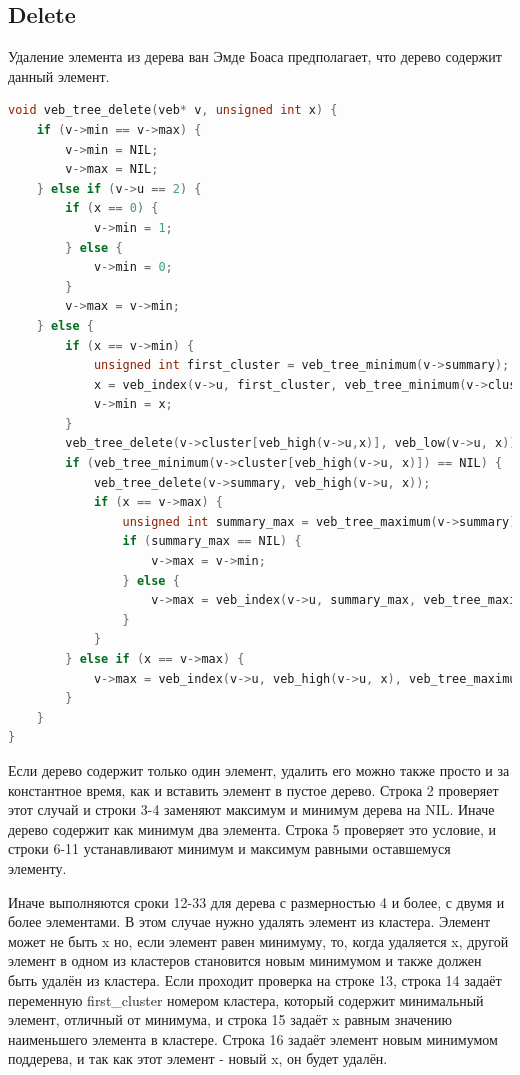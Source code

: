 \documentclass{article}
\begin{document}
\subsection{Delete}
Удаление элемента из дерева ван Эмде Боаса предполагает, что дерево содержит данный элемент.
\begin{lstlisting}[language=C,style=C]
void veb_tree_delete(veb* v, unsigned int x) {
    if (v->min == v->max) {
        v->min = NIL;
        v->max = NIL;
    } else if (v->u == 2) {
        if (x == 0) {
            v->min = 1;
        } else {
            v->min = 0;
        }
        v->max = v->min;
    } else {
        if (x == v->min) {
            unsigned int first_cluster = veb_tree_minimum(v->summary);
            x = veb_index(v->u, first_cluster, veb_tree_minimum(v->cluster[first_cluster]));
            v->min = x;
        }
        veb_tree_delete(v->cluster[veb_high(v->u,x)], veb_low(v->u, x));   
        if (veb_tree_minimum(v->cluster[veb_high(v->u, x)]) == NIL) {
            veb_tree_delete(v->summary, veb_high(v->u, x));
            if (x == v->max) {
                unsigned int summary_max = veb_tree_maximum(v->summary);
                if (summary_max == NIL) {
                    v->max = v->min;
                } else {
                    v->max = veb_index(v->u, summary_max, veb_tree_maximum(v->cluster[summary_max]));
                }       
            }
        } else if (x == v->max) {
            v->max = veb_index(v->u, veb_high(v->u, x), veb_tree_maximum(v->cluster[veb_high(v->u, x)]));
        }
    }
}
\end{lstlisting}

Если дерево содержит только один элемент, удалить его можно также просто и за константное время, как и вставить элемент в пустое дерево. Строка 2 проверяет этот случай и строки 3-4 заменяют максимум и минимум дерева на NIL. Иначе дерево содержит как минимум два элемента. Строка 5 проверяет это условие, и строки 6-11 устанавливают минимум и максимум равными оставшемуся элементу.

Иначе выполняются сроки 12-33 для дерева с размерностью 4 и более, с двумя и более элементами. В этом случае нужно удалять элемент из кластера. Элемент может не быть x но, если элемент равен минимуму, то, когда удаляется x, другой элемент в одном из кластеров становится новым минимумом и также должен быть удалён из кластера. Если проходит проверка на строке 13, строка 14 задаёт переменную first\_cluster номером кластера, который содержит минимальный элемент, отличный от минимума, и строка 15 задаёт x равным значению наименьшего элемента в кластере. Строка 16 задаёт элемент новым минимумом поддерева, и так как этот элемент - новый x, он будет удалён.
\end{document}
